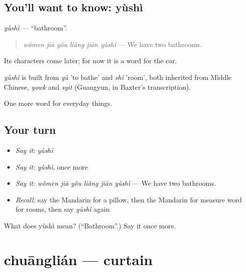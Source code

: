 \subsection*{You'll want to know: yùshì}
\emph{yùshì} — \textquotedblleft{}bathroom\textquotedblright{}.

\begin{quote}
\emph{wǒmen jiā yǒu liǎng jiān yùshì} — We have two bathrooms.
\end{quote}

Its characters come later; for now it is a word for the ear.

\begin{cousinweb}
\emph{yùshì} is built from \emph{yù} 'to bathe' and \emph{shì} 'room', both inherited from Middle Chinese, \emph{yowk} and \emph{syit} (Guangyun, in Baxter's transcription).
\end{cousinweb}

\begin{grammarlens}[title={What you've built}]
One more word for everyday things.
\end{grammarlens}

\subsection*{Your turn}
\begin{itemize}
\raggedright
  \item \emph{Say it:} \emph{yùshì}
  \item \emph{Say it:} \emph{yùshì}, once more
  \item \emph{Say it:} \emph{wǒmen jiā yǒu liǎng jiān yùshì} — We have two bathrooms.
  \item \emph{Recall:} say the Mandarin for a pillow, then the Mandarin for measure word for rooms, then say \emph{yùshì} again
\end{itemize}

\begin{tcolorbox}[breakable,colback=teal!4,colframe=teal!35!black,title={Before you move on}]
What does yùshì mean? (\textquotedblleft{}Bathroom\textquotedblright{}.) Say it once more.
\end{tcolorbox}
\section[chuānglián]{chuānglián — curtain}

\label{lesson:ZH-C181-chuanglian}



